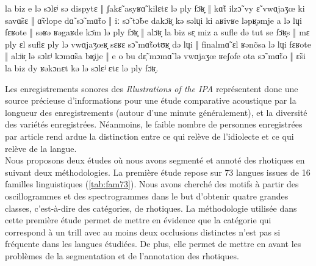 \begin{displayquote}
	{\small la biz e lə sɔlɛʲ sə dispytɛ ‖ ʃakɛ̃ asyʁɑ̃ kilɛtɛ lə ply fɔ̈ʁ̞ ‖ kɑ̃t ilzɔ̃ vy ɛ̃
	vwɑjaʒœ ki savɑ̃sɛ ‖ ɑ̃vlope dɑ̃ sɔ̃ mɑ̃to ‖ iː sɔ̃ tɔ̃be dakɔ̈ʁ̥ kə səlɥi ki
	aʁivʁe ləpʁ̥əmje a lə lɥi fɛʁote ‖ səʁə ʁəgaʁde kɔ̈m lə ply fɔ̈ʁ̥ ‖ alɔ̈ʁ̞ la
	biz sɛ̝ miz a sufle də tut se fɔ̈ʁ̞s ‖ mɛ ply ɛl suflɛ ply lə vwɑjaʒœʁ̞ sɛʁɛ
	sɔ̃ mɑ̃totʊʁ̞ də lɥi ‖ finalmɑ̃ ɛl ʁənõsa lə lɥi fɛʁote ‖ alɔ̈ʁ̞ lə sɔlɛʲ kɔmɑ̃sa
	bʁ̥ije ‖ e o bu dɛ̹̃ mɔmɑ̃ lə vwɑjaʒœ ʁeʃofe ota sɔ̃ mɑ̃to ‖ ɛ̃si la biz dy
	ʁəkɔnɛt kə lə sɔlɛʲ ɛtɛ lə ply fɔ̈ʁ̞.}\\
	\parencite[75]{fougeronFrench1993}
\end{displayquote}


Les enregistrements sonores des \textit{Illustrations of the IPA} représentent donc une source précieuse d'informations pour une étude comparative acoustique par la longueur des enregistrements (autour d'une minute généralement), et la diversité des variétés enregistrées. Néanmoins, le faible nombre de personnes enregistrées par article rend ardue la distinction entre ce qui relève de l'idiolecte et ce qui relève de la langue.\\

Nous proposons deux études où nous avons segmenté et annoté des rhotiques en suivant deux méthodologies.
La première étude repose sur 73 langues issues de 16 familles linguistiques (\autoref{tab:fam73}). Nous avons cherché des motifs à partir des oscillogrammes et des spectrogrammes dans le but d'obtenir quatre grandes classes, c'est-à-dire des catégories, de rhotiques. La méthodologie utilisée dans cette première étude permet de mettre en évidence que la catégorie qui correspond à un trill avec au moins deux occlusions distinctes n'est pas si fréquente dans les langues étudiées. De plus, elle permet de mettre en avant les problèmes de la segmentation et de l'annotation des rhotiques.

